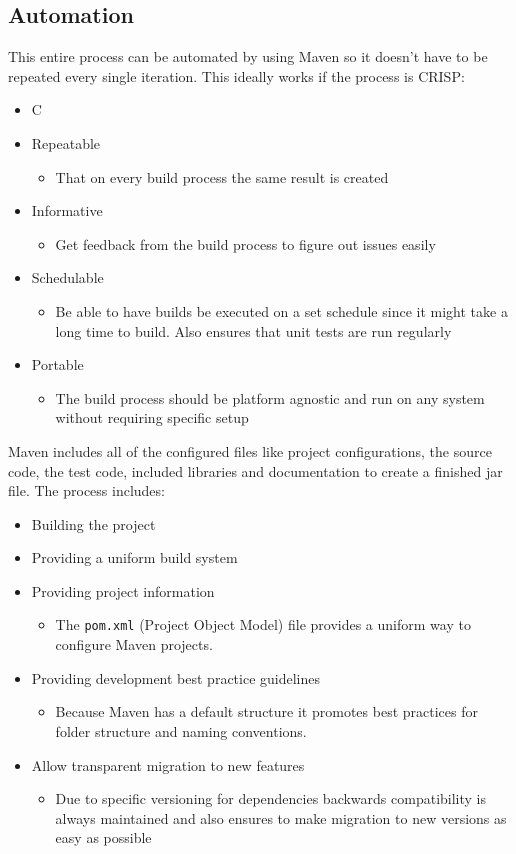\documentclass{article}
\begin{document}
	\subsection{Automation}
	This entire process can be automated by using Maven so it doesn't have to be repeated every single iteration. This ideally works if the process is CRISP:
	\begin{itemize}
		\item{C}
		\item{Repeatable}
		\begin{itemize}
			\item{That on every build process the same result is created}
		\end{itemize}
		\item{Informative}
		\begin{itemize}
			\item{Get feedback from the build process to figure out issues easily}
		\end{itemize}
		\item{Schedulable}
		\begin{itemize}
			\item{Be able to have builds be executed on a set schedule since it might take a long time to build. Also ensures that unit tests are run regularly}
		\end{itemize}
		\item{Portable}
		\begin{itemize}
			\item{The build process should be platform agnostic and run on any system without requiring specific setup}
		\end{itemize}
	\end{itemize}
	Maven includes all of the configured files like project configurations, the source code, the test code, included libraries and documentation to create a finished jar file. The process includes:
	\begin{itemize}
		\item{Building the project}
		\item{Providing a uniform build system}
		\item{Providing project information}
		\begin{itemize}
			\item{The \texttt{pom.xml} (Project Object Model) file provides a uniform way to configure Maven projects.}
		\end{itemize}
		\item{Providing development best practice guidelines}
		\begin{itemize}
			\item{Because Maven has a default structure it promotes best practices for folder structure and naming conventions.}
		\end{itemize}
		\item{Allow transparent migration to new features}
		\begin{itemize}
			\item{Due to specific versioning for dependencies backwards compatibility is always maintained and also ensures to make migration to new versions as easy as possible}
		\end{itemize}
	\end{itemize}
\end{document}

